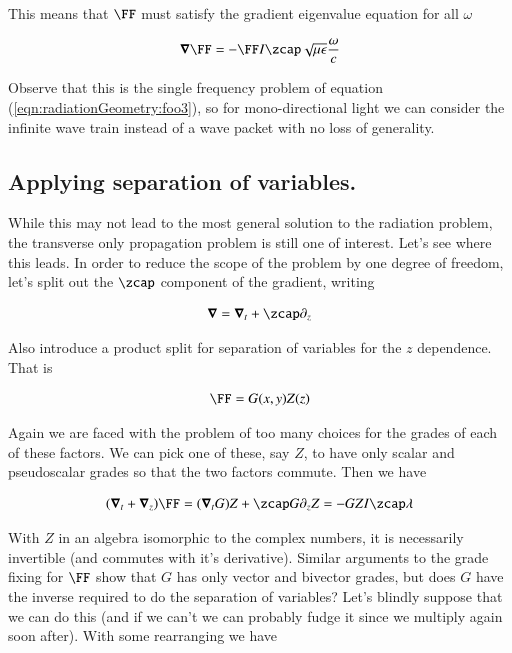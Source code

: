 This means that $\FF$ must satisfy the gradient eigenvalue equation for all $\omega$

\begin{align}\label{eqn:radiationGeometry:foob4}
\spacegrad \FF = -\FF I \zcap \sqrt{\mu\epsilon} \frac{\omega}{c} 
\end{align}

Observe that this is the single frequency problem of equation (\ref{eqn:radiationGeometry:foo3}), so for mono-directional light we can consider the infinite wave train instead of a wave packet with no loss of generality.

\subsection{Applying separation of variables.}

While this may not lead to the most general solution to the radiation problem, the transverse only propagation problem is still one of interest.  Let's see where this leads.  In order to reduce the scope of the problem by one degree of freedom, let's split out the $\zcap$ component of the gradient, writing

\begin{align}\label{eqn:radiationGeometry:fooc1}
\spacegrad = \spacegrad_t + \zcap \partial_z
\end{align}

Also introduce a product split for separation of variables for the $z$ dependence.  That is

\begin{align}\label{eqn:radiationGeometry:fooc2}
\FF = G(x,y) Z(z)
\end{align}

Again we are faced with the problem of too many choices for the grades of each of these factors.  We can pick one of these, say $Z$, to have only scalar and pseudoscalar grades so that the two factors commute.  Then we have

\begin{align*}
(\spacegrad_t + \spacegrad_z) \FF = (\spacegrad_t G) Z + \zcap G \partial_z Z = -G Z I \zcap \lambda 
\end{align*}

With $Z$ in an algebra isomorphic to the complex numbers, it is necessarily invertible (and commutes with it's derivative).  Similar arguments to the grade fixing for $\FF$ show that $G$ has only vector and bivector grades, but does $G$ have the inverse required to do the separation of variables?  Let's blindly suppose that we can do this (and if we can't we can probably fudge it since we multiply again soon after).  With some rearranging we have

